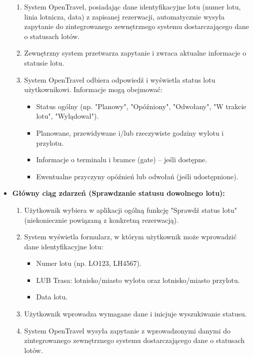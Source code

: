 \documentclass[a4paper,12pt]{article}
\begin{document}
\begin{itemize}
\begin{enumerate}
            \item System OpenTravel, posiadając dane identyfikacyjne lotu (numer lotu, linia lotnicza, data) z zapisanej rezerwacji, automatycznie wysyła zapytanie do zintegrowanego zewnętrznego systemu dostarczającego dane o statusach lotów.
            \item Zewnętrzny system przetwarza zapytanie i zwraca aktualne informacje o statusie lotu.
            \item System OpenTravel odbiera odpowiedź i wyświetla status lotu użytkownikowi. Informacje mogą obejmować:
                \begin{itemize}
                    \item Status ogólny (np. "Planowy", "Opóźniony", "Odwołany", "W trakcie lotu", "Wylądował").
                    \item Planowane, przewidywane i/lub rzeczywiste godziny wylotu i przylotu.
                    \item Informacje o terminalu i bramce (gate) – jeśli dostępne.
                    \item Ewentualne przyczyny opóźnień lub odwołań (jeśli udostępnione).
                \end{itemize}
        \end{enumerate}
    \item \textbf{Główny ciąg zdarzeń (Sprawdzanie statusu dowolnego lotu):}
        \begin{enumerate}
            \item Użytkownik wybiera w aplikacji ogólną funkcję "Sprawdź status lotu" (niekoniecznie powiązaną z konkretną rezerwacją).
            \item System wyświetla formularz, w którym użytkownik może wprowadzić dane identyfikacyjne lotu:
                \begin{itemize}
                    \item Numer lotu (np. LO123, LH4567).
                    \item LUB Trasa: lotnisko/miasto wylotu oraz lotnisko/miasto przylotu.
                    \item Data lotu.
                \end{itemize}
            \item Użytkownik wprowadza wymagane dane i inicjuje wyszukiwanie statusu.
            \item System OpenTravel wysyła zapytanie z wprowadzonymi danymi do zintegrowanego zewnętrznego systemu dostarczającego dane o statusach lotów.

\end{enumerate}
\end{itemize}
\end{document}
